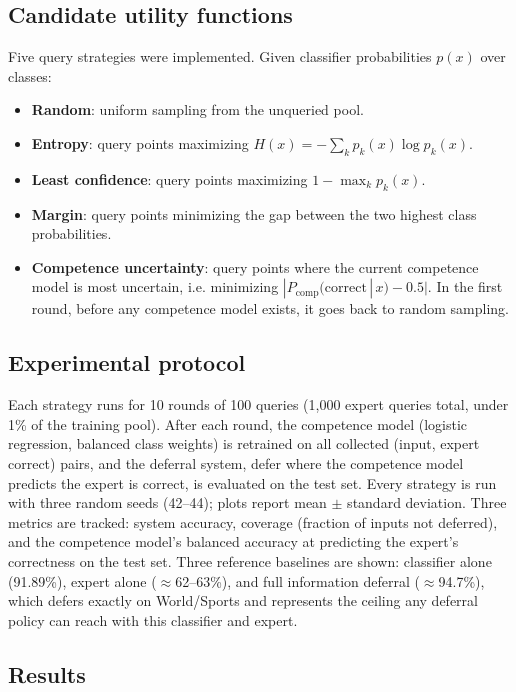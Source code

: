 \documentclass[11pt]{article}
\begin{document}
\subsection{Candidate utility functions}
Five query strategies were implemented. Given classifier probabilities $p(x)$ over classes:
\begin{itemize}
\item \textbf{Random}: uniform sampling from the unqueried pool.
\item \textbf{Entropy}: query points maximizing $H(x) = -\sum_k p_k(x)\log p_k(x)$.
\item \textbf{Least confidence}: query points maximizing $1 - \max_k p_k(x)$.
\item \textbf{Margin}: query points minimizing the gap between the two highest class probabilities.
\item \textbf{Competence uncertainty}: query points where the current competence model is most uncertain, i.e. minimizing $|P_{\text{comp}}(\text{correct}\,|\,x) - 0.5|$. In the first round, before any competence model exists, it goes back to random sampling.
\end{itemize}

\subsection{Experimental protocol}
Each strategy runs for 10 rounds of 100 queries (1{,}000 expert queries total, under 1\% of the training pool). After each round, the competence model (logistic regression, balanced class weights) is retrained on all collected (input, expert correct) pairs, and the deferral system, defer where the competence model predicts the expert is correct, is evaluated on the test set. Every strategy is run with three random seeds (42--44); plots report mean $\pm$ standard deviation. Three metrics are tracked: system accuracy, coverage (fraction of inputs not deferred), and the competence model's balanced accuracy at predicting the expert's correctness on the test set. Three reference baselines are shown: classifier alone (91.89\%), expert alone ($\approx$62--63\%), and full information deferral ($\approx$94.7\%), which defers exactly on World/Sports and represents the ceiling any deferral policy can reach with this classifier and expert.

\subsection{Results}
\end{document}
